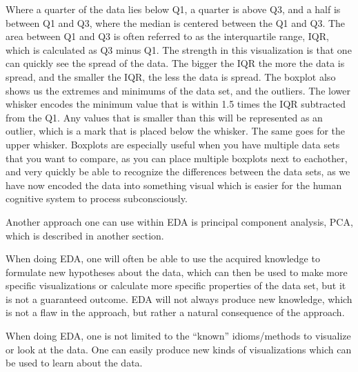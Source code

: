 \documentclass[Report.tex]{subfiles}
\begin{document}
Where a quarter of the data lies below Q1, a quarter is above Q3, and a half is between Q1 and Q3, where the median is centered between
the Q1 and Q3. The area between Q1 and Q3 is often referred to as the interquartile range, IQR, which is calculated as Q3 minus Q1. The strength in this visualization is that one can quickly see the spread of the data. The bigger the IQR the more the data is spread, and the smaller the IQR, the less the data is spread. The boxplot also shows us the extremes and minimums of the data set, and the outliers. The lower whisker encodes the minimum value that is within 1.5 times the IQR subtracted from the Q1. Any values that is smaller than this will be represented as an outlier, which is a mark that is placed below the whisker. The same goes for the upper whisker. Boxplots are especially useful when you have multiple data sets that you want to compare, as you can place multiple boxplots next to eachother, and very quickly be able to recognize the differences between the data sets, as we have now encoded the data into something visual which is easier for the human cognitive system to process subconsciously.

Another approach one can use within EDA is principal component analysis, PCA, which is described in another section.

When doing EDA, one will often be able to use the acquired knowledge to formulate new hypotheses about the data, which can then
be used to make more specific visualizations or calculate more specific properties of the data set, but it
is not a guaranteed outcome. EDA will not always produce new knowledge, which is not a flaw in the approach,
but rather a natural consequence of the approach.

When doing EDA, one is not limited to the ``known'' idioms/methods to visualize or look at the data. One can easily
produce new kinds of visualizations which can be used to learn about the data.


\end{document}
